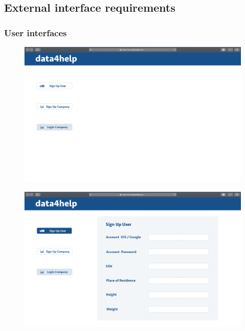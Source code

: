 \documentclass{article}
\begin{document}
\subsection{External interface requirements}
\subsubsection{User interfaces}
\begin{figure}[h!]
\centering
    \textbf{}\par\medskip
	\includegraphics[width= \linewidth]{1homepage.png}
\end{figure}
\begin{figure}[h!]
\centering
    \textbf{}\par\medskip
	\includegraphics[width= \linewidth]{2signupuser.png}
\end{figure}\newpage
\end{document}
